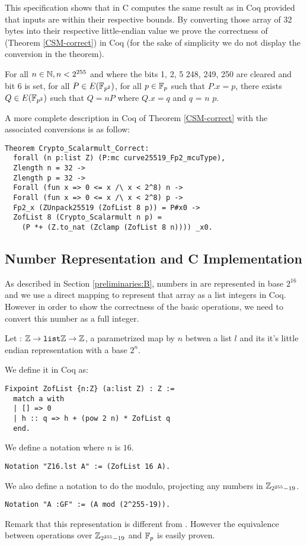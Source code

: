 This specification shows that  in C computes the same
result as  in Coq provided that inputs are within their respective
bounds.
By converting those array of 32 bytes into their respective little-endian value
we prove the correctness of  (Theorem \ref{CSM-correct})
in Coq (for the sake of simplicity we do not display the conversion in the theorem).
\begin{theorem}
\label{CSM-correct}
For all $n \in \mathbb{N}, n < 2^{255}$ and where the bits 1, 2, 5 248, 249, 250
are cleared and bit 6 is set, for all $P \in E(\mathbb{F}_{p^2})$,
for all $p \in \mathbb{F}_{p}$ such that $P.x = p$,
there exists $Q \in E(\mathbb{F}_{p^2})$ such that $Q = nP$ where $Q.x = q$ and $q$ =  $n$ $p$.
\end{theorem}
A more complete description in Coq of Theorem \ref{CSM-correct} with the associated conversions
is as follow:
\begin{lstlisting}[language=Coq]
Theorem Crypto_Scalarmult_Correct:
  forall (n p:list Z) (P:mc curve25519_Fp2_mcuType),
  Zlength n = 32 ->
  Zlength p = 32 ->
  Forall (fun x => 0 <= x /\ x < 2^8) n ->
  Forall (fun x => 0 <= x /\ x < 2^8) p ->
  Fp2_x (ZUnpack25519 (ZofList 8 p)) = P#x0 ->
  ZofList 8 (Crypto_Scalarmult n p) =
    (P *+ (Z.to_nat (Zclamp (ZofList 8 n)))) _x0.
\end{lstlisting}

\subsection{Number Representation and C Implementation}

As described in Section \ref{preliminaries:B}, numbers in  are represented
in base $2^{16}$ and we use a direct mapping to represent that array as a list
integers in Coq. However in order to show the correctness of the basic operations,
we need to convert this number as a full integer.
\begin{definition}
Let  : $\mathbb{Z} \rightarrow \texttt{list} \mathbb{Z} \rightarrow \mathbb{Z}$, a parametrized map by $n$ betwen a list $l$ and its
it's little endian representation with a base $2^n$.
\end{definition}
We define it in Coq as:
\begin{lstlisting}[language=Coq]
Fixpoint ZofList {n:Z} (a:list Z) : Z :=
  match a with
  | [] => 0
  | h :: q => h + (pow 2 n) * ZofList q
  end.
\end{lstlisting}
We define a notation where $n$ is $16$.
\begin{lstlisting}[language=Coq]
Notation "Z16.lst A" := (ZofList 16 A).
\end{lstlisting}
We also define a notation to do the modulo, projecting any numbers in $\mathbb{Z}_{2^{255}-19}$.
\begin{lstlisting}[language=Coq]
Notation "A :GF" := (A mod (2^255-19)).
\end{lstlisting}
Remark that this representation is different from .
However the equivalence between operations over $\mathbb{Z}_{2^{255}-19}$ and $\mathbb{F}_{p}$ is easily proven.

